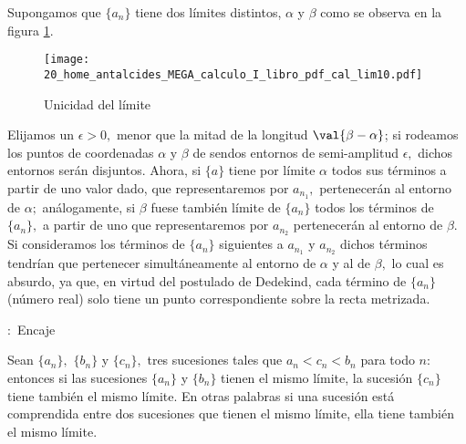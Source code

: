 \begin{dems}

Supongamos que $\{a_{n}\}$ tiene dos límites distintos, $\alpha$
y $\beta$ como se observa en la figura \ref{fig:cal_lim10}. 

\begin{figure}[H] \centering

\texttt{[image: 20\_home\_antalcides\_MEGA\_calculo\_I\_libro\_pdf\_cal\_lim10.pdf]}
\caption{Unicidad del límite}
\label{fig:cal_lim10} \end{figure}

Elijamos un $\epsilon>0,$ menor que la mitad de la longitud $\val{\beta-\alpha}$;
si rodeamos los puntos de coordenadas $\alpha$ y $\beta$ de sendos
entornos de semi-amplitud $\epsilon,$ dichos entornos serán disjuntos.
Ahora, si $\{a\}$ tiene por límite $\alpha$ todos sus términos a
partir de uno valor dado, que representaremos por $a_{n_{1}},$ pertenecerán
al entorno de $\alpha;$ análogamente, si $\beta$ fuese también límite
de $\{a_{n}\}$ todos los términos de $\{a_{n}\},$ a partir de uno
que representaremos por $a_{n_{2}}$ pertenecerán al entorno de $\beta.$
Si consideramos los términos de $\{a_{n}\}$ siguientes a $a_{n_{1}}$
y $a_{n_{2}}$ dichos términos tendrían que pertenecer simultáneamente
al entorno de $\alpha$ y al de $\beta,$ lo cual es absurdo, ya que,
en virtud del postulado de Dedekind, cada término de $\{a_{n}\}$
(número real) solo tiene un punto correspondiente sobre la recta metrizada.\end{dems}

\begin{propiedad}{:\ Encaje}

Sean $\{a_{n}\},$ $\{b_{n}\}$ y $\{c_{n}\},$ tres sucesiones tales
que $a_{n}<c_{n}<b_{n}$ para todo $n:$ entonces si las sucesiones
$\{a_{n}\}$ y $\{b_{n}\}$ tienen el mismo límite, la sucesión $\{c_{n}\}$
tiene también el mismo límite. En otras palabras si una sucesión está
comprendida entre dos sucesiones que tienen el mismo límite, ella
tiene también el mismo límite.

\end{propiedad}

